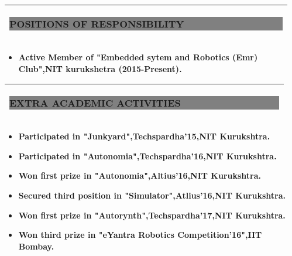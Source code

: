 \documentclass[12pt,a4paper,oneside]{letter}
\begin{document}
\begin{tabular}{|l|}
	\hline
	\colorbox{gray}{\begin{Large}
			
			\textbf{POSITIONS OF RESPONSIBILITY$\qquad$ $\qquad $  $\qquad $  $\qquad$ $\quad$   }
	\end{Large}   }  \\ \hline
\end{tabular}
\begin{itemize}
	\item \textbf{Active Member of "Embedded sytem and Robotics (Emr) Club",NIT kurukshetra (2015-Present).}
\end{itemize}

\begin{tabular}{|l|}
	\hline
	\colorbox{gray}{\begin{Large}
			
			\textbf{EXTRA ACADEMIC ACTIVITIES$\qquad$ $\qquad $  $\qquad $  $\qquad$ $\quad$   }
	\end{Large}   }  \\ \hline
\end{tabular}
\begin{itemize}
	\item \textbf{Participated in "Junkyard",Techspardha'15,NIT Kurukshtra.}
	\item \textbf{Participated in "Autonomia",Techspardha'16,NIT Kurukshtra.}
	\item \textbf{Won first prize in "Autonomia",Altius'16,NIT Kurukshtra.}
	\item \textbf{Secured third position in "Simulator",Atlius'16,NIT Kurukshtra.}
	\item \textbf{Won first prize in "Autorynth",Techspardha'17,NIT Kurukshtra.}
	\item \textbf{Won third prize in "eYantra Robotics Competition'16",IIT Bombay.}
\end{itemize}
	
\end{document}
